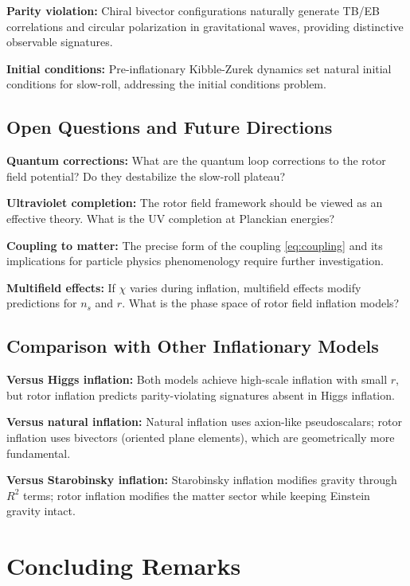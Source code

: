 \documentclass[11pt,a4paper]{article}
\numberwithin{equation}{section}
\theoremstyle{plain}
\theoremstyle{definition}
\theoremstyle{remark}
\begin{document}
\textbf{Parity violation:} Chiral bivector configurations naturally generate TB/EB correlations and circular polarization in gravitational waves, providing distinctive observable signatures.

\textbf{Initial conditions:} Pre-inflationary Kibble-Zurek dynamics set natural initial conditions for slow-roll, addressing the initial conditions problem.

\subsection{Open Questions and Future Directions}

\textbf{Quantum corrections:} What are the quantum loop corrections to the rotor field potential? Do they destabilize the slow-roll plateau?

\textbf{Ultraviolet completion:} The rotor field framework should be viewed as an effective theory. What is the UV completion at Planckian energies?

\textbf{Coupling to matter:} The precise form of the coupling \eqref{eq:coupling} and its implications for particle physics phenomenology require further investigation.

\textbf{Multifield effects:} If $\chi$ varies during inflation, multifield effects modify predictions for $n_s$ and $r$. What is the phase space of rotor field inflation models?

\subsection{Comparison with Other Inflationary Models}

\textbf{Versus Higgs inflation:} Both models achieve high-scale inflation with small $r$, but rotor inflation predicts parity-violating signatures absent in Higgs inflation.

\textbf{Versus natural inflation:} Natural inflation uses axion-like pseudoscalars; rotor inflation uses bivectors (oriented plane elements), which are geometrically more fundamental.

\textbf{Versus Starobinsky inflation:} Starobinsky inflation modifies gravity through $R^2$ terms; rotor inflation modifies the matter sector while keeping Einstein gravity intact.

\section{Concluding Remarks}
\label{sec:conclusion}
\end{document}
